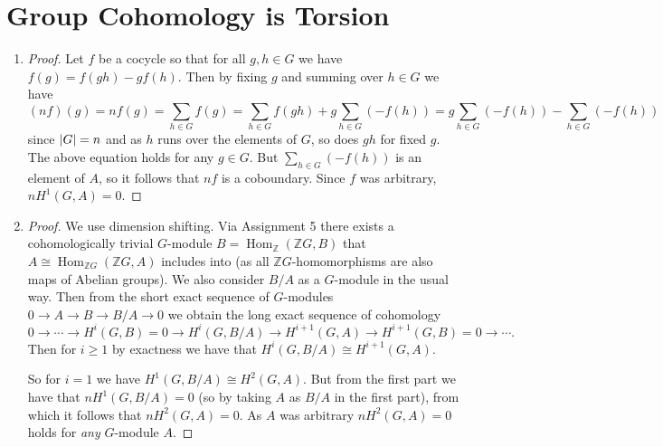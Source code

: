 \documentclass[11pt]{article}
\DeclareMathOperator{\Hom}{Hom}
\begin{document}
\section{Group Cohomology is Torsion}
\begin{enumerate}[label=(\alph*)]
    \item \begin{proof}
        Let $f$ be a cocycle so that for all $g,h\in G$ we have $f(g) = f(gh)-gf(h)$. Then by fixing $g$ and summing over $h\in G$ we have \[(nf)(g) = nf(g) = \sum_{h\in G} f(g) = \sum_{h\in G} f(gh)+ g\sum_{h\in G} (-f(h)) = g\sum_{h\in G} (-f(h)) - \sum_{h\in G} (-f(h))\] since $\abs{G} = n$ and as $h$ runs over the elements of $G$, so does $gh$ for fixed $g$. The above equation holds for any $g\in G$. But $\sum_{h\in G} (-f(h))$ is an element of $A$, so it follows that $nf$ is a coboundary. Since $f$ was arbitrary, $nH^1(G,A) = 0$.
    \end{proof}
    \item \begin{proof}
        We use dimension shifting. Via Assignment 5 there exists a cohomologically trivial $G$-module $B = \Hom_\mathbb{Z}(\mathbb{Z}G,B)$ that $A \cong \Hom_{\mathbb{Z}G}(\mathbb{Z}G,A)$ includes into (as all $\mathbb{Z}G$-homomorphisms are also maps of Abelian groups). We also consider $B/A$ as a $G$-module in the usual way. Then from the short exact sequence of $G$-modules $0\to A\to B\to B/A\to 0$ we obtain the long exact sequence of cohomology \[0\to\cdots\to H^i(G,B) = 0\to H^i(G,B/A)\to H^{i+1}(G,A)\to H^{i+1}(G,B) = 0\to \cdots.\] Then for $i\geq 1$ by exactness we have that $H^i(G,B/A)\cong H^{i+1}(G,A)$. 
    
        So for $i = 1$ we have $H^1(G,B/A)\cong H^{2}(G,A)$. But from the first part we have that $nH^1(G,B/A) = 0$ (so by taking $A$ as $B/A$ in the first part), from which it follows that $nH^2(G,A) = 0$. As $A$ was arbitrary $nH^2(G,A) = 0$ holds for \textit{any} $G$-module $A$. 
        

\end{proof}
\end{enumerate}
\end{document}
